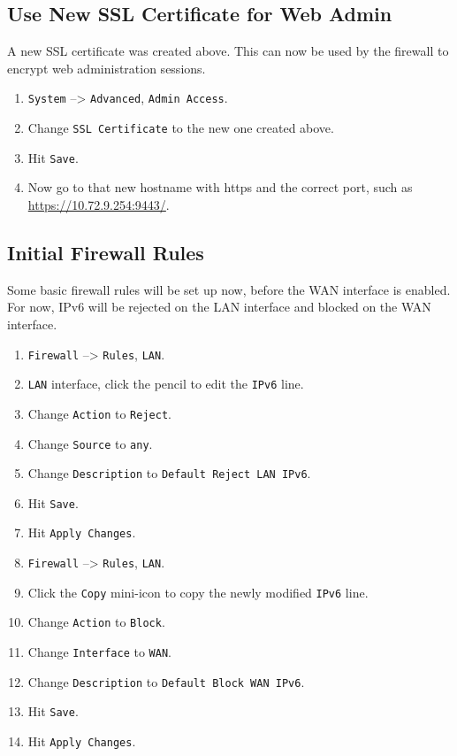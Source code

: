 \subsection{Use New SSL Certificate for Web Admin}
A new SSL certificate was created above. This can now be used by the firewall to encrypt web administration sessions.

\begin{enumerate}
 \item \texttt{System} --> \texttt{Advanced}, \texttt{Admin Access}.
 \item Change \texttt{SSL Certificate} to the new one created above.
 \item Hit \texttt{Save}.
 \item Now go to that new hostname with https and the correct port, such as \url{https://10.72.9.254:9443/}.
\end{enumerate}

\subsection{Initial Firewall Rules}
Some basic firewall rules will be set up now, before the WAN interface is enabled.
For now, IPv6 will be rejected on the LAN interface and blocked on the WAN interface.

\begin{enumerate}
 \item \texttt{Firewall} --> \texttt{Rules}, \texttt{LAN}.
 \item \texttt{LAN} interface, click the pencil to edit the \texttt{IPv6} line.
 \item Change \texttt{Action} to \texttt{Reject}.
 \item Change \texttt{Source} to \texttt{any}.
 \item Change \texttt{Description} to \texttt{Default Reject LAN IPv6}.
 \item Hit \texttt{Save}.
 \item Hit \texttt{Apply Changes}.
 \item \texttt{Firewall} --> \texttt{Rules}, \texttt{LAN}.
 \item Click the \texttt{Copy} mini-icon to copy the newly modified \texttt{IPv6} line.
 \item Change \texttt{Action} to \texttt{Block}.
 \item Change \texttt{Interface} to \texttt{WAN}.
 \item Change \texttt{Description} to \texttt{Default Block WAN IPv6}.
 \item Hit \texttt{Save}.
 \item Hit \texttt{Apply Changes}.
\end{enumerate}

